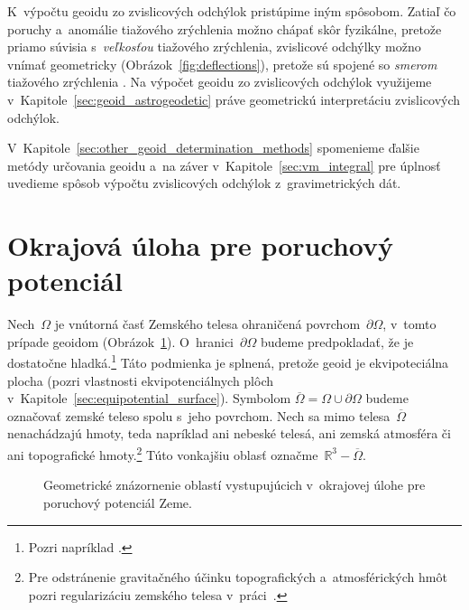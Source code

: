 \documentclass[a4paper, 12pt]{book}
\begin{document}
K~výpočtu geoidu zo zvislicových odchýlok pristúpime iným spôsobom.  Zatiaľ čo 
poruchy a~anomálie tiažového zrýchlenia možno chápať skôr fyzikálne, pretože 
priamo súvisia s~\emph{veľkosťou} tiažového zrýchlenia, zvislicové odchýlky 
možno vnímať geometricky (Obrázok~\ref{fig:deflections}), pretože sú spojené so 
\emph{smerom} tiažového zrýchlenia \parencite{MoritzPhysicalGeodesy}.  Na 
výpočet geoidu zo zvislicových odchýlok využijeme 
v~Kapitole~\ref{sec:geoid_astrogeodetic} práve geometrickú interpretáciu 
zvislicových odchýlok.

V~Kapitole~\ref{sec:other_geoid_determination_methods} spomenieme ďalšie metódy 
určovania geoidu a~na záver v~Kapitole~\ref{sec:vm_integral} pre úplnosť 
uvedieme spôsob výpočtu zvislicových odchýlok z~gravimetrických dát.


\section{Okrajová úloha pre poruchový potenciál}
\label{sec:boundary_value_problem}

Nech~$\Omega$ je vnútorná časť Zemského telesa ohraničená povrchom~$\partial 
\Omega$, v~tomto prípade geoidom (Obrázok~\ref{fig:boundary_value_problems}).  
O~hranici~$\partial \Omega$ budeme predpokladať, že je dostatočne 
hladká.\footnote{Pozri napríklad \textcite{SansoGeoidDetermination}.}  Táto 
podmienka je splnená, pretože geoid je ekvipoteciálna plocha (pozri vlastnosti 
ekvipotenciálnych plôch v~Kapitole~\ref{sec:equipotential_surface}).  Symbolom 
$\overline{\Omega} = \Omega \cup \partial\Omega$ budeme označovať zemské teleso 
spolu s~jeho povrchom.  Nech sa mimo telesa~$\overline{\Omega}$ nenachádzajú 
hmoty, teda napríklad ani nebeské telesá, ani zemská atmosféra či ani 
topografické hmoty.\footnote{Pre odstránenie gravitačného účinku topografických 
a~atmosférických hmôt pozri regularizáciu zemského telesa 
v~práci~\textcite{Janak2006}.}  Túto vonkajšiu oblasť označme~$\mathbb{R}^3 
- \overline{\Omega}$.

\begin{figure}[bt]
\centering

\caption{Geometrické znázornenie oblastí vystupujúcich v~okrajovej úlohe pre 
poruchový potenciál Zeme.}
\label{fig:boundary_value_problems}
\end{figure}
\end{document}
